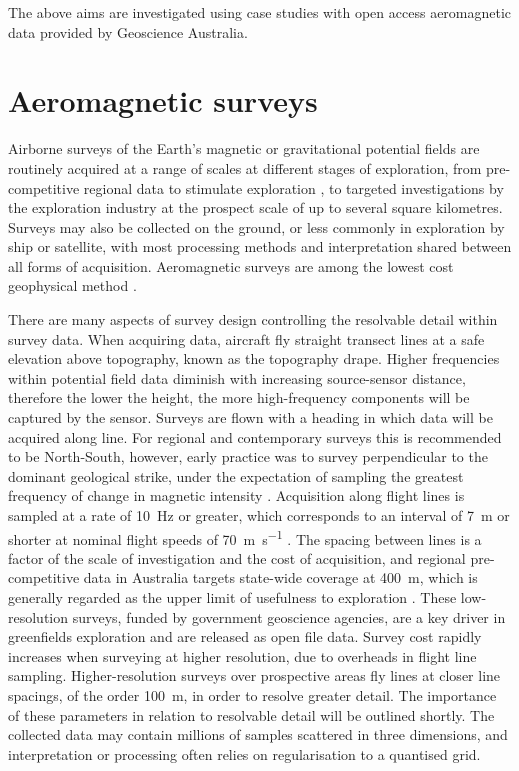 The above aims are investigated using case studies with open access aeromagnetic data provided by Geoscience Australia.

\section{Aeromagnetic surveys}
\label{sec:introgeo}
Airborne surveys of the Earth's magnetic or gravitational potential fields are routinely acquired at a range of scales at different stages of exploration, from pre-competitive regional data to stimulate exploration \parencite{howardAirborneGeophysicalCoverage2004}, to targeted investigations by the exploration industry at the prospect scale of up to several square kilometres.
Surveys may also be collected on the ground, or less commonly in exploration by ship or satellite, with most processing methods and interpretation shared between all forms of acquisition.
Aeromagnetic surveys are among the lowest cost geophysical method \parencite{dentithGeophysicsMineralExploration2014}.

There are many aspects of survey design controlling the resolvable detail within survey data.
When acquiring data, aircraft fly straight transect lines at a safe elevation above topography, known as the topography drape.
Higher frequencies within potential field data diminish with increasing source-sensor distance, therefore the lower the height, the more high-frequency components will be captured by the sensor.
Surveys are flown with a heading in which data will be acquired along line.
For regional and contemporary surveys this is recommended to be North-South, however, early practice was to survey perpendicular to the dominant geological strike, under the expectation of sampling the greatest frequency of change in magnetic intensity \parencite{islesGeologicalInterpretationAeromagnetic2013}.
Acquisition along flight lines is sampled at a rate of \qty{10}{\hertz} or greater, which corresponds to an interval of \qty{7}{\m} or shorter at nominal flight speeds of \qty{70}{\m\per\s} \parencite{goodwinAirborneMagneticRadiometric2023}.
The spacing between lines is a factor of the scale of investigation and the cost of acquisition, and regional pre-competitive data in Australia targets state-wide coverage at \qty{400}{\m}, which is generally regarded as the upper limit of usefulness to exploration \parencite{howardAirborneGeophysicalCoverage2004}.
These low-resolution surveys, funded by government geoscience agencies, are a key driver in greenfields exploration and are released as open file data.
Survey cost rapidly increases when surveying at higher resolution, due to overheads in flight line sampling.
Higher-resolution surveys over prospective areas fly lines at closer line spacings, of the order \qty{100}{\m}, in order to resolve greater detail.
The importance of these parameters in relation to resolvable detail will be outlined shortly.
The collected data may contain millions of samples scattered in three dimensions, and interpretation or processing often relies on regularisation to a quantised grid.

